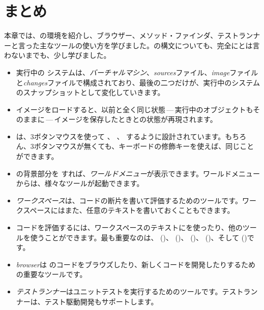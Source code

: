 \documentclass[a4paper,10pt,twoside]{book}
\begin{document}
\section{まとめ}
本章では、\pharo の環境を紹介し、ブラウザー、メソッド・ファインダ、テストランナーと言った主なツールの使い方を学びました。\pharo の構文についても、完全にとは言わないまでも、少し学びました。

\begin{itemize}
  \item 実行中の \pharo システムは、\emph{バーチャルマシン}、\emph{sources}ファイル、\emph{image}ファイルと\emph{changes}ファイルで構成されており、最後の二つだけが、実行中のシステムのスナップショットとして変化していきます。
  \item \pharo イメージをロードすると、以前と全く同じ状態\,---\,実行中のオブジェクトもそのままに\,---\,イメージを保存したときとの状態が再現されます。
  \item \pharo は、3ボタンマウスを使って \click、 \actclick、 \metaclick するように設計されています。もちろん、3ボタンマウスが無くても、キーボードの修飾キーを使えば、同じことができます。
  \item \pharo の背景部分を \click すれば、\emph{ワールドメニュー}が表示できます。ワールドメニューからは、様々なツールが起動できます。
  \item \emph{ワークスペース}は、コードの断片を書いて評価するためのツールです。ワークスペースにはまた、任意のテキストを書いておくこともできます。
  \item コードを評価するには、ワークスペースのテキストにを使ったり、他のツールを使うことができます。最も重要なのは、 ()、 ()、 ()、 ()、そして ()です。
  \item \emph{browser}は \pharo のコードをブラウズしたり、新しくコードを開発したりするための重要なツールです。
  \item \emph{テストランナー}はユニットテストを実行するためのツールです。テストランナーは、テスト駆動開発もサポートします。
\end{itemize}

\ifx\wholebook\relax\else 
   
   
\end{document}
